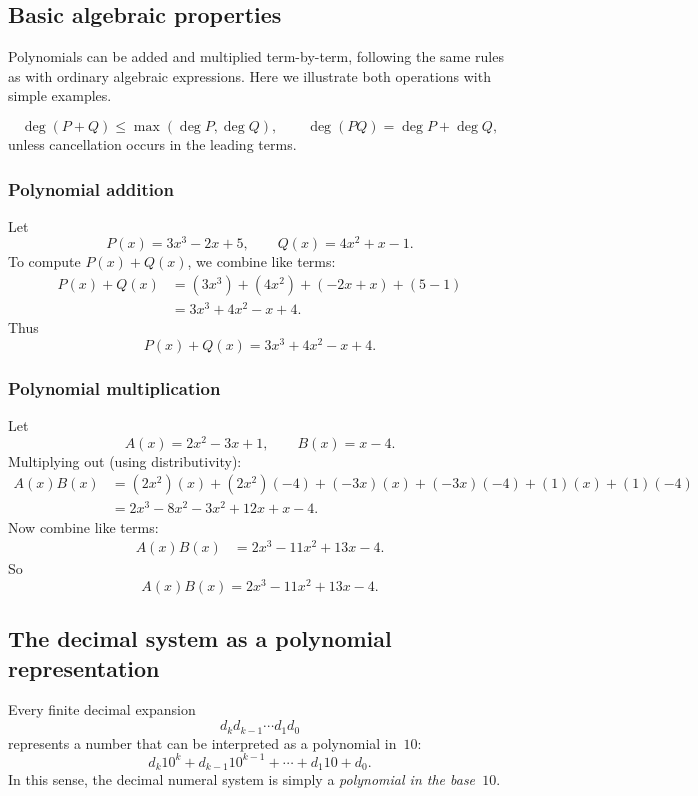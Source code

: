 \subsection{Basic algebraic properties}

Polynomials can be added and multiplied term-by-term, following the same
rules as with ordinary algebraic expressions.  Here we illustrate both
operations with simple examples.

\[
\deg(P+Q)\le\max(\deg P,\deg Q),\qquad
\deg(PQ)=\deg P+\deg Q,
\]
unless cancellation occurs in the leading terms.

\subsubsection*{Polynomial addition}

Let
\[
P(x)=3x^3 - 2x + 5,\qquad
Q(x)=4x^2 + x - 1.
\]
To compute $P(x)+Q(x)$, we combine like terms:
\[
\begin{aligned}
P(x)+Q(x)
&= (3x^3) + (4x^2) + (-2x+x) + (5-1) \\
&= 3x^3 + 4x^2 - x + 4.
\end{aligned}
\]
Thus
\[
\boxed{\,P(x)+Q(x)=3x^3 + 4x^2 - x + 4.\,}
\]

\subsubsection*{Polynomial multiplication}

Let
\[
A(x)=2x^2 - 3x + 1,\qquad
B(x)=x - 4.
\]
Multiplying out (using distributivity):
\[
\begin{aligned}
A(x)B(x)
&=(2x^2)(x) + (2x^2)(-4)
 +(-3x)(x)+(-3x)(-4)
 +(1)(x)+(1)(-4) \\
&= 2x^3 - 8x^2 - 3x^2 + 12x + x -4.
\end{aligned}
\]
Now combine like terms:
\[
\begin{aligned}
A(x)B(x)
&= 2x^3 - 11x^2 + 13x - 4.
\end{aligned}
\]
So
\[
\boxed{\,A(x)B(x)=2x^3 - 11x^2 + 13x - 4.\,}
\]

\subsection{The decimal system as a polynomial representation}

Every finite decimal expansion
\[
d_k d_{k-1} \cdots d_1 d_0
\]
represents a number that can be interpreted as a polynomial in~$10$:
\[
d_k 10^{k} + d_{k-1} 10^{k-1} + \cdots + d_1 10 + d_0.
\]
In this sense, the decimal numeral system is simply a \emph{polynomial in the base~$10$}.


